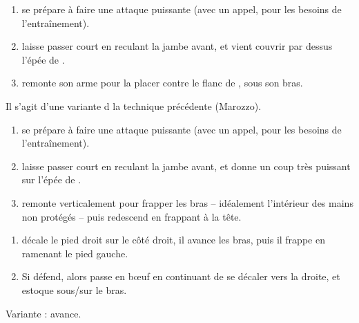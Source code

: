 \begin{technique}

\begin{enumerate}
	\item \A se prépare à faire une attaque puissante (avec un appel, pour les besoins de l'entraînement).
	
	\item \D laisse passer court en reculant la jambe avant, et vient couvrir par dessus l'épée de \A.
	
	\item \D remonte son arme pour la placer contre le flanc de \A, sous son bras.
\end{enumerate}

\end{technique}


\begin{technique}
Il s'agit d'une variante d la technique précédente (Marozzo).

\begin{enumerate}
	\item \A se prépare à faire une attaque puissante (avec un appel, pour les besoins de l'entraînement).
	
	\item \D laisse passer court en reculant la jambe avant, et donne un coup très puissant sur l'épée de \A.
	
	\item \D remonte verticalement pour frapper les bras -- idéalement l'intérieur des mains non protégés -- puis redescend en frappant à la tête.
\end{enumerate}

\end{technique}


\begin{technique}

\begin{enumerate}
	\item \A décale le pied droit sur le côté droit, il avance les bras, puis il frappe en ramenant le pied gauche.
	
	\item Si \D défend, alors \A passe en bœuf en continuant de se décaler vers la droite, et estoque sous/sur le bras.
\end{enumerate}

Variante : \D avance.

\end{technique}



